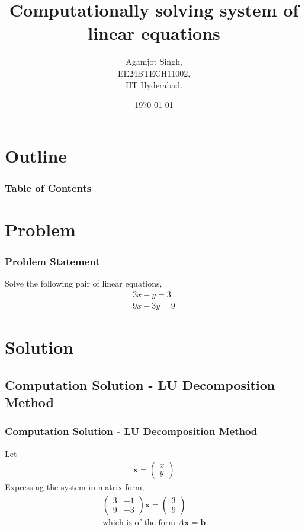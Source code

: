 \documentclass{beamer}
\title{Computationally solving system of linear equations \brak{\text{10.3.3.1.3}}}
\author{Agamjot Singh,\\EE24BTECH11002,\\IIT Hyderabad.}
\date{\today}
\theoremstyle{remark}
\newcommand{\myvec}[1]{\ensuremath{\begin{pmatrix}#1\end{pmatrix}}}
\let\vec\mathbf
\numberwithin{equation}{section}
\begin{document}
\begin{frame}
\titlepage
\end{frame}

\section*{Outline}
\begin{frame}
\frametitle{Table of Contents}
\tableofcontents
\end{frame}

\section{Problem}

\begin{frame}
\frametitle{Problem Statement}
Solve the following pair of linear equations,
\begin{align}
    3x - y = 3\\
    9x - 3y = 9
\end{align}
\end{frame}

\section{Solution}

\subsection{Computation Solution - LU Decomposition Method}
\begin{frame}
\frametitle{Computation Solution - LU Decomposition Method}
Let
\begin{align}
    \vec{x} = \myvec{x\\y}
\end{align}
Expressing the system in matrix form,
\begin{align}
    \myvec{3 & -1\\9 & -3}\vec{x} = \myvec{3\\9}\\
    \text{which is of the form } A\vec{x} = \vec{b}
\end{align}
\end{frame}
\end{document}
